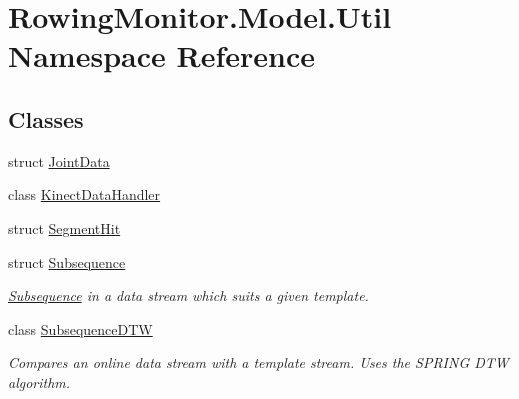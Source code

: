 \hypertarget{namespace_rowing_monitor_1_1_model_1_1_util}{}\section{Rowing\+Monitor.\+Model.\+Util Namespace Reference}
\label{namespace_rowing_monitor_1_1_model_1_1_util}
\subsection*{Classes}
\begin{DoxyCompactItemize}
\item 
struct \hyperlink{struct_rowing_monitor_1_1_model_1_1_util_1_1_joint_data}{Joint\+Data}
\item 
class \hyperlink{class_rowing_monitor_1_1_model_1_1_util_1_1_kinect_data_handler}{Kinect\+Data\+Handler}
\item 
struct \hyperlink{struct_rowing_monitor_1_1_model_1_1_util_1_1_segment_hit}{Segment\+Hit}
\item 
struct \hyperlink{struct_rowing_monitor_1_1_model_1_1_util_1_1_subsequence}{Subsequence}
\begin{DoxyCompactList}\small\item\em \hyperlink{struct_rowing_monitor_1_1_model_1_1_util_1_1_subsequence}{Subsequence} in a data stream which suits a given template. \end{DoxyCompactList}\item 
class \hyperlink{class_rowing_monitor_1_1_model_1_1_util_1_1_subsequence_d_t_w}{Subsequence\+D\+TW}
\begin{DoxyCompactList}\small\item\em Compares an online data stream with a template stream. Uses the S\+P\+R\+I\+NG D\+TW algorithm. \end{DoxyCompactList}\end{DoxyCompactItemize}
